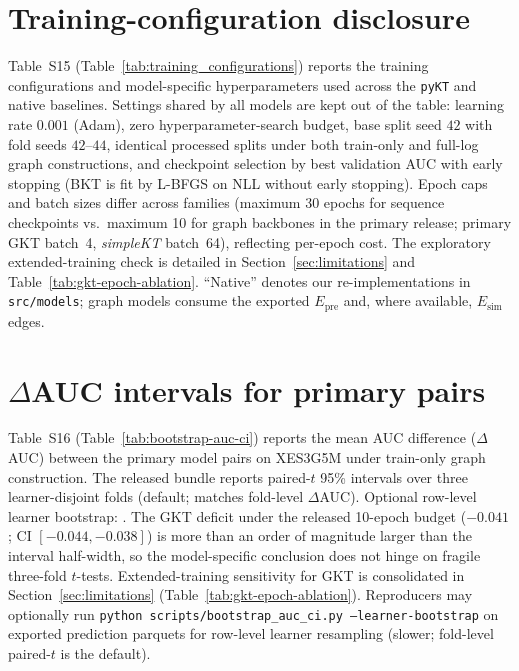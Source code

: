 \documentclass[preprint,11pt]{elsarticle}
\newcommand{\Epre}{\ensuremath{E_{\text{pre}}}}
\newcommand{\Esim}{\ensuremath{E_{\text{sim}}}}
\begin{document}
\clearpage
\section{Training-configuration disclosure}
\label{sec:supp-training-parity}
Table~S15 (Table~\ref{tab:training_configurations}) reports the training
configurations and model-specific hyperparameters used across the \texttt{pyKT}
and native baselines. Settings
shared by all models are kept out of the table: learning rate $0.001$
(Adam), zero hyperparameter-search budget, base split seed $42$ with fold
seeds $42$--$44$, identical processed splits under both train-only and
full-log graph constructions, and checkpoint selection by best validation
AUC with early stopping (BKT is fit by L-BFGS on NLL without early
stopping). Epoch caps and batch sizes differ across families (maximum 30
epochs for sequence checkpoints vs.\ maximum 10 for graph backbones in the
primary release; primary GKT batch~4, \textit{simpleKT} batch~64),
reflecting per-epoch cost. The exploratory extended-training check is detailed in
Section~\ref{sec:limitations} and Table~\ref{tab:gkt-epoch-ablation}.
``Native'' denotes
our re-implementations in \texttt{src/models}; graph models consume the
exported $\Epre$ and, where available, $\Esim$ edges.
\begin{table}[!t]
\centering
\caption{Training configurations and hyperparameters (Table S15)}
\label{tab:training_configurations}

\end{table}

\section{$\Delta$AUC intervals for primary pairs}
\label{sec:supp-bootstrap}
Table~S16 (Table~\ref{tab:bootstrap-auc-ci}) reports the mean AUC difference
($\Delta$AUC) between the primary model pairs on XES3G5M under train-only
graph construction. The released bundle reports paired-$t$ 95\% intervals
over three learner-disjoint folds (default; matches fold-level
$\Delta$AUC). Optional row-level learner bootstrap:
.
The GKT deficit under the released 10-epoch budget ($-0.041$; CI $[-0.044,-0.038]$) is more than an order of
magnitude larger than the interval half-width, so the model-specific conclusion
does not hinge on fragile three-fold $t$-tests. Extended-training sensitivity
for GKT is consolidated in Section~\ref{sec:limitations}
(Table~\ref{tab:gkt-epoch-ablation}). Reproducers may optionally run
\texttt{python scripts/bootstrap\_auc\_ci.py --learner-bootstrap} on exported
prediction parquets for row-level learner resampling (slower; fold-level
paired-$t$ is the default).
\begin{table}[h!]
\centering
\caption{$\Delta$AUC intervals for primary pairs, XES3G5M, train-only graphs (Table S16)}
\label{tab:bootstrap-auc-ci}

\end{table}
\end{document}
